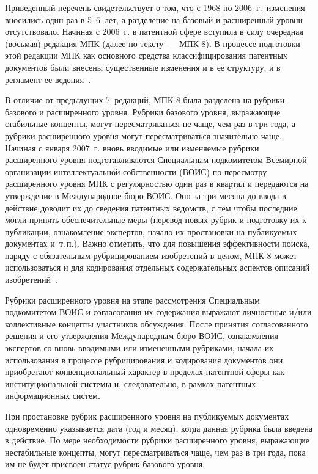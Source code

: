 \begin{multicols}{2}
   Приведенный перечень свидетельствует о том, что с 1968 по 2006~г.\ изменения
вносились один раз в 5--6~лет, а разделение на базовый и расширенный уровни
отсутствовало. Начиная с 2006~г. в патентной сфере вступила в силу очередная (восьмая)
редакция МПК (далее по тексту~--- МПК-8). В процессе подготовки этой редакции МПК как
основного средства классифицирования патентных документов были внесены существенные
изменения и в ее структуру, и в регламент ее ведения~\cite{8za}.

   В отличие от предыдущих 7~редакций, МПК-8 была разделена на рубрики базового и
расширенного уровня. Рубрики базового уровня, вы\-ра\-жа\-ющие стабильные концепты, могут
пересматриваться не чаще, чем раз в три года, а рубрики расширенного уровня могут
пересматриваться значительно чаще. Начиная с января 2007~г. вновь вводимые или
изменяемые рубрики расширенного уровня подготавливаются Специальным подкомитетом
Всемирной организации интеллектуальной собственности (ВОИС) по пересмотру
расширенного уровня МПК с регулярностью один раз в квартал и передаются на
утверждение в Международное бюро ВОИС. Оно за три месяца до ввода в действие доводит
их до сведения патентных ведомств, с тем чтобы последние могли принять обеспечительные
меры (перевод новых рубрик и подготовку их к публикации, ознакомление экспертов, начало
их простановки на публикуемых документах и~т.\,п.). Важно отметить, что для повышения
эффективности поиска, наряду с обязательным рубрицированием изобретений в целом,
МПК-8 может использоваться и для кодирования отдельных содержательных аспектов
описаний изобретений~\cite{9za}.

   Рубрики расширенного уровня на этапе рас\-смот\-ре\-ния Специальным подкомитетом ВОИС
и согласования их содержания выражают личностные и/или коллективные концепты
участников обсуж\-де\-ния. После принятия согласованного решения и его утверждения
Международным бюро ВОИС, ознакомления экспертов со вновь вводимыми или
измененными рубриками, начала их использования в процессе рубрицирования и
кодирования документов они приобретают конвенциональный характер в пределах
патентной сферы как институциональной системы и, следовательно, в рамках патентных
информационных систем.

   При простановке рубрик расширенного уровня на публикуемых документах
одновременно указывается дата (год и месяц), когда данная рубрика была введена в
действие. По мере не\-обхо\-ди\-мости рубрики расширенного уровня, выражающие
нестабильные концепты, могут пересматриваться чаще, чем раз в три года, пока им не будет
присвоен статус рубрик базового уровня.


\end{multicols}
